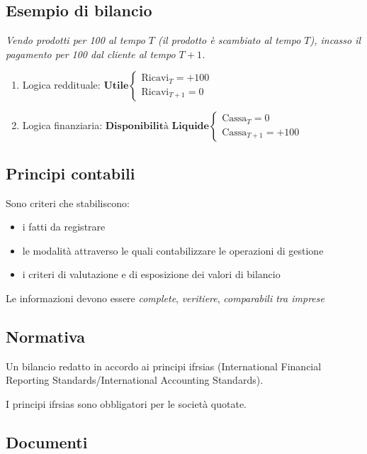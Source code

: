 \documentclass[10pt,a4paper,fleqn,oneside]{book}
\begin{document}
\subsection{Esempio di bilancio}
\textit{Vendo prodotti per 100 al tempo $T$ (il prodotto è scambiato al tempo $T$), incasso il pagamento per 100 dal cliente al tempo $T+1$.}
\begin{enumerate}
    \item Logica reddituale: \quad
    $
        \textbf{Utile}
        \begin{cases}
            \text{Ricavi}_T = +100\\
            \text{Ricavi}_{T+1} = 0
        \end{cases}
    $
    \item Logica finanziaria: \quad
    $
    \textbf{Disponibilità Liquide}
    \begin{cases}
        \text{Cassa}_T = 0\\
        \text{Cassa}_{T+1} = +100
    \end{cases}
    $
\end{enumerate}

\subsection{Principi contabili}
Sono criteri che stabiliscono:
\begin{itemize}
    \item i fatti da registrare
    \item le modalità attraverso le quali contabilizzare le operazioni di gestione
    \item i criteri di valutazione e di esposizione dei valori di bilancio
\end{itemize}

Le informazioni devono essere \emph{complete}, \emph{veritiere}, \emph{comparabili tra imprese}

\subsection{Normativa}
Un \gls{bilancio} redatto in accordo ai principi \gls{ifrsias} (International Financial
Reporting Standards/International Accounting Standards).

I principi \gls{ifrsias} sono obbligatori per le società quotate.

\subsection{Documenti}
\end{document}
